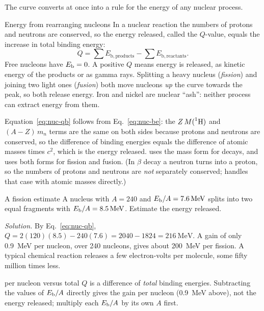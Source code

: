 The curve converts at once into a rule for the energy of any nuclear process.
\begin{keybox}{Energy from rearranging nucleons}
In a nuclear reaction the numbers of protons and neutrons are conserved, so the energy released, called
the $Q$-value, equals the increase in total binding energy:
\begin{equation}\label{eq:nuc-qb}
Q=\sum E_{\mathrm{b},\text{products}}-\sum E_{\mathrm{b},\text{reactants}}.
\end{equation}
Free nucleons have $E_{\mathrm{b}}=0$. A positive $Q$ means energy is released, as kinetic energy of the products
or as gamma rays. Splitting a heavy nucleus (\emph{fission}) and joining two light ones
(\emph{fusion}) both move nucleons \emph{up} the curve towards the peak, so both release energy. Iron and
nickel are nuclear ``ash'': neither process can extract energy from them.
\end{keybox}
Equation~\eqref{eq:nuc-qb} follows from Eq.~\eqref{eq:nuc-be}: the $Z\,M(\prescript{1}{}{\mathrm{H}})$ and $(A-Z)\,m_n$
terms are the same on both sides because protons and neutrons are conserved, so the difference of
binding energies equals the difference of atomic masses times $c^2$, which is the energy released.
 uses the mass form for decays, and  uses both forms for fission and
fusion. (In $\beta$ decay a neutron turns into a proton, so the numbers of protons and neutrons are
\emph{not} separately conserved;  handles that case with atomic masses directly.)

\begin{exbox}{A fission estimate}\label{ex:nuc-fission}
A nucleus with $A=240$ and $\Eb/A=\SI{7.6}{\MeV}$ splits into two equal fragments with
$\Eb/A=\SI{8.5}{\MeV}$. Estimate the energy released.

\emph{Solution.} By Eq.~\eqref{eq:nuc-qb},
$Q=2(120)(8.5)-240(7.6)=2040-1824=\SI{216}{\MeV}$. A gain of only \SI{0.9}{\MeV} per nucleon, over 240
nucleons, gives about \SI{200}{\MeV} per fission. A typical chemical reaction releases a few
electron-volts per molecule, some fifty million times less.
\end{exbox}

\begin{trapbox}{per nucleon versus total}
$Q$ is a difference of \emph{total} binding energies. Subtracting the values of $E_{\mathrm{b}}/A$ directly gives
the gain per nucleon (\SI{0.9}{\MeV} above), not the energy released; multiply each $E_{\mathrm{b}}/A$ by its own
$A$ first.
\end{trapbox}


